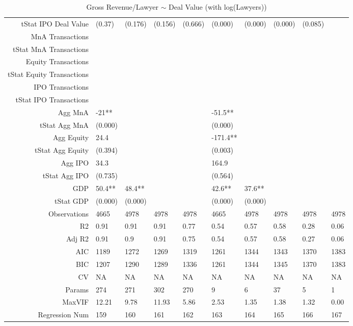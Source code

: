 \begin{table}[ht]
\begin{tabular}{rlllllllll}
  tStat IPO Deal Value & (0.37) & (0.176) & (0.156) & (0.666) & (0.000) & (0.000) & (0.000) & (0.085) &  \\ 
  MnA Transactions &  &  &  &  &  &  &  &  &  \\ 
  tStat MnA Transactions &  &  &  &  &  &  &  &  &  \\ 
  Equity Transactions &  &  &  &  &  &  &  &  &  \\ 
  tStat Equity Transactions &  &  &  &  &  &  &  &  &  \\ 
  IPO Transactions &  &  &  &  &  &  &  &  &  \\ 
  tStat IPO Transactions &  &  &  &  &  &  &  &  &  \\ 
  Agg MnA & -21** &  &  &  & -51.5** &  &  &  &  \\ 
  tStat Agg MnA & (0.000) &  &  &  & (0.000) &  &  &  &  \\ 
  Agg Equity & 24.4 &  &  &  & -171.4** &  &  &  &  \\ 
  tStat Agg Equity & (0.394) &  &  &  & (0.003) &  &  &  &  \\ 
  Agg IPO & 34.3 &  &  &  & 164.9 &  &  &  &  \\ 
  tStat Agg IPO & (0.735) &  &  &  & (0.564) &  &  &  &  \\ 
  GDP & 50.4** & 48.4** &  &  & 42.6** & 37.6** &  &  &  \\ 
  tStat GDP & (0.000) & (0.000) &  &  & (0.000) & (0.000) &  &  &  \\ 
  Observations & 4665 & 4978 & 4978 & 4978 & 4665 & 4978 & 4978 & 4978 & 4978 \\ 
  R2 & 0.91 & 0.91 & 0.91 & 0.77 & 0.54 & 0.57 & 0.58 & 0.28 & 0.06 \\ 
  Adj R2 & 0.91 & 0.9 & 0.91 & 0.75 & 0.54 & 0.57 & 0.58 & 0.27 & 0.06 \\ 
  AIC & 1189 & 1272 & 1269 & 1319 & 1261 & 1344 & 1343 & 1370 & 1383 \\ 
  BIC & 1207 & 1290 & 1289 & 1336 & 1261 & 1344 & 1345 & 1370 & 1383 \\ 
  CV & NA & NA & NA & NA & NA & NA & NA & NA & NA \\ 
  Params & 274 & 271 & 302 & 270 & 9 & 6 & 37 & 5 & 1 \\ 
  MaxVIF & 12.21 & 9.78 & 11.93 & 5.86 & 2.53 & 1.35 & 1.38 & 1.32 & 0.00 \\ 
  Regression Num & 159 & 160 & 161 & 162 & 163 & 164 & 165 & 166 & 167 \\ 
   \hline
\end{tabular}
\caption{Gross Revenue/Lawyer $\sim$ Deal Value (with log(Lawyers))} 
\end{table}
